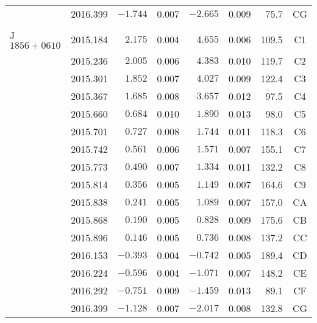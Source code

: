 \begin{table}[h]
\begin{tabular}{lrrrrrrc}
						&2016.399  & $-1.744$ &  0.007   &  $-2.665$  &  0.009 &  75.7  & CG \\
						&&&&&&& \\ \hline
			J$1856+0610$&2015.184  & $ 2.175$ &  0.004   &  $ 4.655$  &  0.006 & 109.5 &  C1 \\
						&2015.236  & $ 2.005$ &  0.006   &  $ 4.383$  &  0.010 & 119.7 &  C2 \\
						&2015.301  & $ 1.852$ &  0.007   &  $ 4.027$  &  0.009 & 122.4 &  C3 \\
						&2015.367  & $ 1.685$ &  0.008   &  $ 3.657$  &  0.012 &  97.5 &  C4 \\
						&2015.660  & $ 0.684$ &  0.010   &  $ 1.890$  &  0.013 &  98.0 &  C5 \\
						&2015.701  & $ 0.727$ &  0.008   &  $ 1.744$  &  0.011 & 118.3 &  C6 \\
						&2015.742  & $ 0.561$ &  0.006   &  $ 1.571$  &  0.007 & 155.1 &  C7 \\
						&2015.773  & $ 0.490$ &  0.007   &  $ 1.334$  &  0.011 & 132.2 &  C8 \\
						&2015.814  & $ 0.356$ &  0.005   &  $ 1.149$  &  0.007 & 164.6 &  C9 \\
						&2015.838  & $ 0.241$ &  0.005   &  $ 1.089$  &  0.007 & 157.0 &  CA \\
						&2015.868  & $ 0.190$ &  0.005   &  $ 0.828$  &  0.009 & 175.6 &  CB \\
						&2015.896  & $ 0.146$ &  0.005   &  $ 0.736$  &  0.008 & 137.2 &  CC \\
						&2016.153  & $-0.393$ &  0.004   &  $-0.742$  &  0.005 & 189.4 &  CD \\
						&2016.224  & $-0.596$ &  0.004   &  $-1.071$  &  0.007 & 148.2 &  CE \\
						&2016.292  & $-0.751$ &  0.009   &  $-1.459$  &  0.013 &  89.1 &  CF \\
						&2016.399  & $-1.128$ &  0.007   &  $-2.017$  &  0.008 & 132.8 &  CG \\
			\bottomrule
		\end{tabular}
	\end{table} 
	
